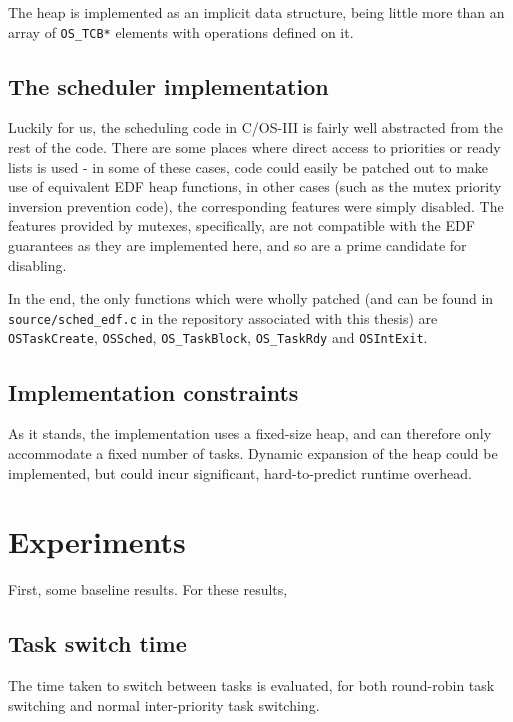 \documentclass[twoside]{uva-inf-bachelor-thesis}
\newcommand{\code}[1]{\lstinline{#1}}
\newcommand{\ucosiii}{\textmu C/OS-III\xspace}
\begin{document}
The heap is implemented as an implicit data structure, being little more than an array of \code{OS_TCB*} elements with operations defined on it.

\section{The scheduler implementation}
Luckily for us, the scheduling code in \ucosiii is fairly well abstracted from the rest of the code. There are some places where direct access to priorities or ready lists is used - in some of these cases, code could easily be patched out to make use of equivalent EDF heap functions, in other cases (such as the mutex priority inversion prevention code), the corresponding features were simply disabled. The features provided by mutexes, specifically, are not compatible with the EDF guarantees as they are implemented here, and so are a prime candidate for disabling.

In the end, the only functions which were wholly patched (and can be found in \code{source/sched_edf.c} in the repository associated with this thesis) are \code{OSTaskCreate}, \code{OSSched}, \code{OS_TaskBlock}, \code{OS_TaskRdy} and \code{OSIntExit}.

\section{Implementation constraints}
As it stands, the implementation uses a fixed-size heap, and can therefore only accommodate a fixed number of tasks. Dynamic expansion of the heap could be implemented, but could incur significant, hard-to-predict runtime overhead.

%
%
%
%

\chapter{Experiments}
First, some baseline results. For these results,

\section{Task switch time}
The time taken to switch between tasks is evaluated, for both round-robin task switching and normal inter-priority task switching.
\end{document}
